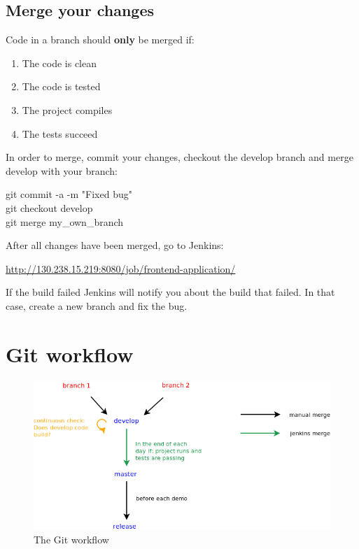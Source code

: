 \documentclass[11pt]{article}
\newenvironment{myindentpar}[1]%
 {\begin{list}{}%
         {\setlength{\leftmargin}{#1}}%
         \item[]%
 }
 {\end{list}}
\begin{document}
\subsection{Merge your changes}
Code in a branch should \textbf{only} be merged if:

\begin{enumerate}
\item The code is clean
\item The code is tested
\item The project compiles
\item The tests succeed
\end{enumerate}

In order to merge, commit your changes, checkout the
develop branch and merge develop with your branch:

\begin{myindentpar}{3cm}
git commit -a -m "Fixed bug"\\
git checkout develop\\
git merge my\_own\_branch
\end{myindentpar}

After all changes have been merged, go to Jenkins:
\begin{myindentpar}{1cm}
\url{http://130.238.15.219:8080/job/frontend-application/}
\end{myindentpar}

If the build failed Jenkins will notify you about the
build that failed. In that case, create a new branch and fix
the bug.

\section{Git workflow}

\begin{figure}[ht!]
\centering
\includegraphics[scale=0.5]{frontend_workflow}
\caption{The Git workflow}\label{fig:workflow}
\end{figure}
\end{document}
